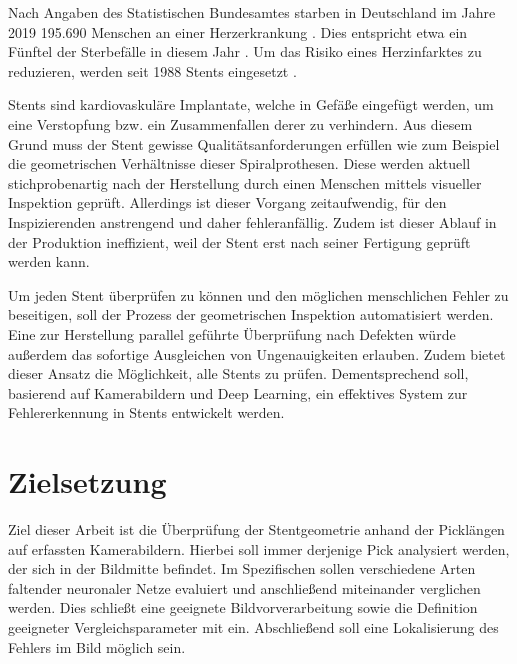 Nach Angaben des Statistischen Bundesamtes starben in Deutschland im Jahre 2019 195.690 Menschen an einer Herzerkrankung \cite{destatis2}. Dies entspricht etwa ein Fünftel der Sterbefälle in diesem Jahr \cite{destatis}. Um das Risiko eines Herzinfarktes zu reduzieren, werden seit 1988 Stents eingesetzt \cite{sigwart}.

\mypar Stents sind kardiovaskuläre Implantate, welche in Gefäße eingefügt werden, um eine Verstopfung bzw. ein Zusammenfallen derer zu verhindern. Aus diesem Grund muss der Stent gewisse Qualitätsanforderungen erfüllen wie zum Beispiel die geometrischen Verhältnisse dieser Spiralprothesen. Diese werden aktuell stichprobenartig nach der Herstellung durch einen Menschen mittels visueller Inspektion geprüft. Allerdings ist dieser Vorgang zeitaufwendig, für den Inspizierenden anstrengend und daher fehleranfällig. Zudem ist dieser Ablauf in der Produktion  ineffizient, weil der Stent erst nach seiner Fertigung geprüft werden kann.

\mypar Um jeden Stent überprüfen zu können und den möglichen menschlichen Fehler zu beseitigen, soll der Prozess der geometrischen Inspektion automatisiert werden. Eine zur Herstellung parallel geführte Überprüfung nach Defekten würde außerdem das sofortige Ausgleichen von Ungenauigkeiten erlauben. Zudem bietet dieser Ansatz die Möglichkeit, alle Stents zu prüfen. Dementsprechend soll, basierend auf Kamerabildern und Deep Learning, ein effektives System zur Fehlererkennung in Stents entwickelt werden. 


\section{Zielsetzung}\label{sec:zielsetzung-sec}
Ziel dieser Arbeit ist die Überprüfung der Stentgeometrie anhand der Picklängen auf erfassten Kamerabildern. Hierbei soll immer derjenige Pick analysiert werden, der sich in der Bildmitte befindet. Im Spezifischen sollen verschiedene Arten faltender neuronaler Netze evaluiert und anschließend miteinander verglichen werden. Dies schließt eine geeignete Bildvorverarbeitung sowie die Definition geeigneter Vergleichsparameter mit ein. Abschließend soll eine Lokalisierung des Fehlers im Bild möglich sein.



